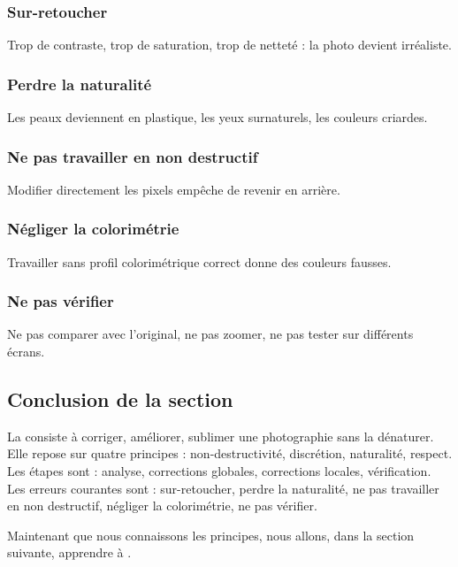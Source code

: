\subsubsection{Sur-retoucher}

Trop de contraste, trop de saturation, trop de netteté : la photo devient irréaliste.

\subsubsection{Perdre la naturalité}

Les peaux deviennent en plastique, les yeux surnaturels, les couleurs criardes.

\subsubsection{Ne pas travailler en non destructif}

Modifier directement les pixels empêche de revenir en arrière.

\subsubsection{Négliger la colorimétrie}

Travailler sans profil colorimétrique correct donne des couleurs fausses.

\subsubsection{Ne pas vérifier}

Ne pas comparer avec l'original, ne pas zoomer, ne pas tester sur différents écrans.

\subsection*{Conclusion de la section}

La  consiste à corriger, améliorer, sublimer une photographie sans la dénaturer. Elle repose sur quatre principes : non-destructivité, discrétion, naturalité, respect. Les étapes sont : analyse, corrections globales, corrections locales, vérification. Les erreurs courantes sont : sur-retoucher, perdre la naturalité, ne pas travailler en non destructif, négliger la colorimétrie, ne pas vérifier.

Maintenant que nous connaissons les principes, nous allons, dans la section suivante, apprendre à .

